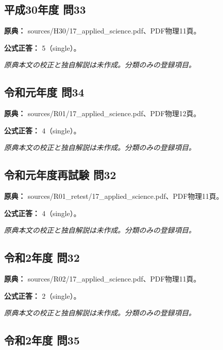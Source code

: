 \subsection{平成30年度 問33}
\label{q:h30-reg-applied-33}

\noindent\textbf{原典：} sources/H30/17\_applied\_science.pdf、PDF物理11頁。

\textbf{公式正答：} 5（single）。

\par\textit{原典本文の校正と独自解説は未作成。分類のみの登録項目。}

\subsection{令和元年度 問34}
\label{q:r01-reg-applied-34}

\noindent\textbf{原典：} sources/R01/17\_applied\_science.pdf、PDF物理12頁。

\textbf{公式正答：} 4（single）。

\par\textit{原典本文の校正と独自解説は未作成。分類のみの登録項目。}

\subsection{令和元年度再試験 問32}
\label{q:r01-ret-applied-32}

\noindent\textbf{原典：} sources/R01\_retest/17\_applied\_science.pdf、PDF物理11頁。

\textbf{公式正答：} 4（single）。

\par\textit{原典本文の校正と独自解説は未作成。分類のみの登録項目。}

\subsection{令和2年度 問32}
\label{q:r02-reg-applied-32}

\noindent\textbf{原典：} sources/R02/17\_applied\_science.pdf、PDF物理11頁。

\textbf{公式正答：} 2（single）。

\par\textit{原典本文の校正と独自解説は未作成。分類のみの登録項目。}

\subsection{令和2年度 問35}
\label{q:r02-reg-applied-35}

